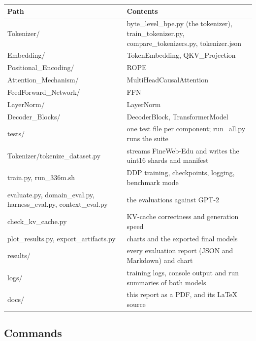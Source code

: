 \documentclass[11pt]{article}
\begin{document}
\begin{center}
\small
\begin{tabularx}{\linewidth}{>{\raggedright\arraybackslash}X>{\raggedright\arraybackslash}X}
\toprule
\textbf{Path} & \textbf{Contents} \\
\midrule
Tokenizer/\allowbreak{} & byte\_\allowbreak{}level\_\allowbreak{}bpe.py (the tokenizer), train\_\allowbreak{}tokenizer.py, compare\_\allowbreak{}tokenizers.py, tokenizer.json \\
Embedding/\allowbreak{} & TokenEmbedding, QKV\_\allowbreak{}Projection \\
Positional\_\allowbreak{}Encoding/\allowbreak{} & ROPE \\
Attention\_\allowbreak{}Mechanism/\allowbreak{} & MultiHeadCausalAttention \\
FeedForward\_\allowbreak{}Network/\allowbreak{} & FFN \\
LayerNorm/\allowbreak{} & LayerNorm \\
Decoder\_\allowbreak{}Blocks/\allowbreak{} & DecoderBlock, TransformerModel \\
tests/\allowbreak{} & one test file per component; run\_\allowbreak{}all.py runs the suite \\
Tokenizer/\allowbreak{}tokenize\_\allowbreak{}dataset.py & streams FineWeb-Edu and writes the uint16 shards and manifest \\
train.py, run\_\allowbreak{}336m.sh & DDP training, checkpoints, logging, benchmark mode \\
evaluate.py, domain\_\allowbreak{}eval.py, harness\_\allowbreak{}eval.py, context\_\allowbreak{}eval.py & the evaluations against GPT-2 \\
check\_\allowbreak{}kv\_\allowbreak{}cache.py & KV-cache correctness and generation speed \\
plot\_\allowbreak{}results.py, export\_\allowbreak{}artifacts.py & charts and the exported final models \\
results/\allowbreak{} & every evaluation report (JSON and Markdown) and chart \\
logs/\allowbreak{} & training logs, console output and run summaries of both models \\
docs/\allowbreak{} & this report as a PDF, and its LaTeX source \\
\bottomrule
\end{tabularx}
\end{center}

\subsection{Commands}
\end{document}

